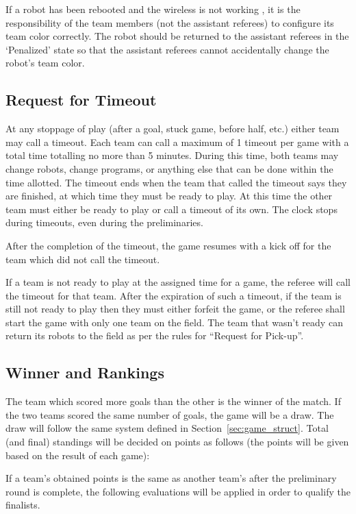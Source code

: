 \documentclass[12pt]{article}
\begin{document}
If a robot has been rebooted and the wireless is not working
, it is
the responsibility of the team members (not the assistant referees)
to configure its team color correctly.  The robot should be returned
to the assistant referees in the `Penalized' state so that the
assistant referees cannot accidentally change the robot's team color.

\subsection{Request for Timeout}

At any stoppage of play (after a goal, stuck game, before half,
etc.) either team may call a timeout.  Each team can call a maximum
of 1 timeout per game with a total time totalling no more than 5
minutes.  During this time, both teams may change robots, change
programs, or anything else that can be done within the time
allotted.  The timeout ends when the team that called the timeout
says they are finished, at which time they must be ready to play. At
this time the other team must either be ready to play or call a
timeout of its own.  The clock stops during timeouts, even during
the preliminaries.

After the completion of the timeout, the game resumes with a kick
off for the team which did not call the timeout.

If a team is not ready to play at the assigned time for a game, the
referee will call the timeout for that team.  After the expiration
of such a timeout, if the team is still not ready to play then they
must either forfeit the game, or the referee shall start the game with
only one team on the field.  The team that wasn't ready can return
its robots to the field as per the rules for ``Request for Pick-up''.

\subsection{Winner and Rankings}
The team which scored more goals than the other is the winner of the
match. If the two teams scored the same number of goals, the game
will be a draw. The draw will follow the same system defined in
Section~\ref{sec:game_struct}. Total (and final) standings will be
decided on points as follows (the points will be given based on the
result of each game):


If a team's obtained points is the same as another team's after the
preliminary round is complete, the following evaluations will be
applied in order to qualify the finalists.
\end{document}
